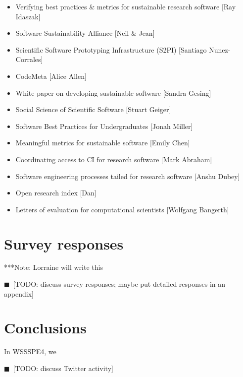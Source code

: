 \documentclass[11pt, oneside]{amsart}
\newcommand{\todo}[1]{{\color{blue}$\blacksquare$~\textsf{[TODO: #1]}}}
\newcommand{\note}[1]{ {\textcolor{blueish}    { ***Note:      #1 }}}
\begin{document}
\begin{itemize}
\item Verifying best practices \& metrics for sustainable research software [Ray Idaszak]
\item Software Sustainability Alliance [Neil \& Jean]
\item Scientific Software Prototyping Infrastructure (S2PI) [Santiago Nunez-Corrales] 
\item CodeMeta [Alice Allen]
\item White paper on developing sustainable software [Sandra Gesing]
\item Social Science of Scientific Software [Stuart Geiger]
\item Software Best Practices for Undergraduates [Jonah Miller]
\item Meaningful metrics for sustainable software [Emily Chen]
\item Coordinating access to CI for research software [Mark Abraham]
\item Software engineering processes tailed for research software [Anshu Dubey]
\item Open research index [Dan]
\item Letters of evaluation for computational scientists [Wolfgang Bangerth]
\end{itemize}








\section{Survey responses \label{sec:survey}}

\note{Lorraine will write this}

\todo{discuss survey responses; maybe put detailed responses in an appendix}


\section{Conclusions} \label{sec:conclusions}

In WSSSPE4, we

\todo{discuss Twitter activity}
\end{document}
